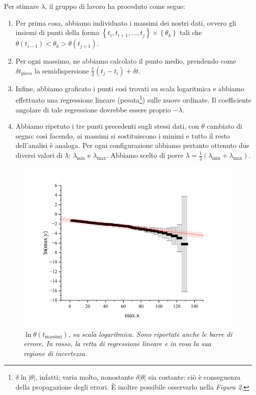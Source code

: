 \documentclass{article}
\begin{document}
\pagebreak
Per stimare $\lambda$, il gruppo di lavoro ha proceduto come segue:
\begin{enumerate}
  \item
    Per prima cosa, abbiamo individuato i massimi dei nostri dati,
    ovvero gli insiemi di punti della forma
    $\left\{t_i,t_{i+1},\dots,t_j\right\}\times\left\{\theta_k\right\}$
    tali che $\theta(t_{i-1}) < \theta_k > \theta(t_{j+1})$.
  \item
    Per ogni massimo, ne abbiamo calcolato il punto medio,
    prendendo come $\delta t_\text{picco}$ la semidispersione $\frac{1}{2}(t_j - t_i) + \delta t$.
  \item
    Infine, abbiamo graficato i punti così trovati
    su scala logaritmica e
    abbiamo effettuato una regressione lineare (pesata\footnote{
      $\delta\!\ln{\left|\theta\right|}$, infatti, varia molto,
      nonostante $\delta\!\left|\theta\right|$ sia costante:
      ciò è conseguenza della propagazione degli errori.
      È inoltre possibile osservarlo nella \emph{Figura 2}.
    })
    sulle nuove ordinate. Il coefficiente angolare di tale
    regressione dovrebbe essere proprio $-\lambda$.
  \item
    Abbiamo ripetuto i tre punti precedenti sugli stessi dati,
    con $\theta$ cambiato di segno: così facendo, ai massimi
    si sostituiscono i minimi e tutto il resto dell'analisi
    è analoga. Per ogni configurazione abbiamo pertanto ottenuto
    due diversi valori di $\lambda$: $\lambda_\text{min}$ e
    $\lambda_\text{max}$. Abbiamo scelto di porre
    $\lambda=\frac{1}{2}(\lambda_\text{min}+\lambda_\text{max})$.
\end{enumerate}

\begin{center}
    \begin{figure}[H]
        \includegraphics[trim={2cm 1cm 2cm 2.1cm},clip,width=\textwidth]{img/0max-exp.png}
        \caption[]{\emph{
            $\ln{\theta(t_\text{massimi})}$, su scala logaritmica.
            Sono riportate anche le barre di errore.
            In rosso, la retta di regressione lineare
            e in rosa la sua regione di incertezza.
        }}
    \end{figure}
\end{center}
\end{document}
